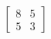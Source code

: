 \documentclass[preview]{standalone}
\begin{document}
\begin{align*}
\begin{bmatrix} 8 & 5 \\ 5 & 3 \end{bmatrix}
\end{align*}
\end{document}

